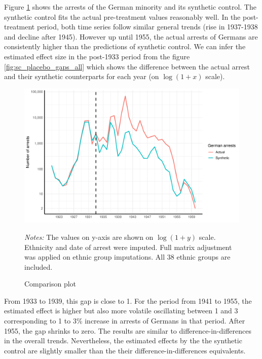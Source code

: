 %


Figure \ref{fig:sc_comp_plot} shows the  arrests of the German minority and its synthetic control.
The synthetic control fits the actual pre-treatment values reasonably well. 
In the post-treatment period, both time series follow similar general trends (rise in 1937-1938 and decline after 1945). 
However up until 1955, the actual arrests of Germans are consistently higher than the predictions of  synthetic control. %
We can infer the estimated effect size in the post-1933 period  from 
the figure  \ref{fig:sc_placebo_gaps_all} which shows the difference between the actual arrest and their synthetic counterparts for each year (on $\log(1 + x)$ scale). 

 \begin{figure}[h]
\centering
\caption{Comparison plot}
\includegraphics[width=\textwidth]{plots/synthetic_control/ethnicity_imputation/annual/comparison_plot_scaled.pdf}
\begin{minipage}{0.92\textwidth}
\footnotesize
\emph{Notes:} The values on y-axis are shown on $\log\left(1 + y\right)$ scale.  Ethnicity and date of arrest were imputed.  Full matrix adjustment was applied on ethnic group imputations. All 38 ethnic groups are included. 
\end{minipage}
\label{fig:sc_comp_plot}
\end{figure}


From 1933 to 1939, this gap is close to 1. For the period from 1941 to 1955, the estimated effect is higher but also more volatile oscillating between 1 and 3 corresponding to 1 to 3\% increase in arrests of Germans in that period.  After 1955, the gap shrinks to zero. 
The results are similar to difference-in-differences in the overall trends. Nevertheless, the estimated effects by the  the synthetic control  are slightly smaller than the their difference-in-differences equivalents.  

